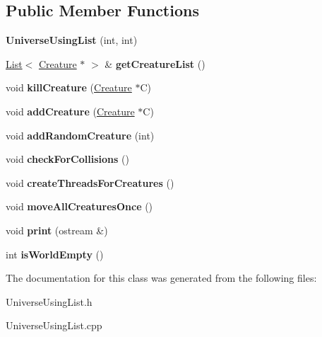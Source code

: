 \subsection*{Public Member Functions}
\begin{DoxyCompactItemize}
\item 
{\bfseries Universe\+Using\+List} (int, int)\hypertarget{class_universe_using_list_a690190032d86eadad922b33166d6d11a}{}\label{class_universe_using_list_a690190032d86eadad922b33166d6d11a}

\item 
\hyperlink{class_list}{List}$<$ \hyperlink{class_creature}{Creature} $\ast$ $>$ \& {\bfseries get\+Creature\+List} ()\hypertarget{class_universe_using_list_a36f07f521195e099c92408ce25ac9928}{}\label{class_universe_using_list_a36f07f521195e099c92408ce25ac9928}

\item 
void {\bfseries kill\+Creature} (\hyperlink{class_creature}{Creature} $\ast$C)\hypertarget{class_universe_using_list_ad5ae1ddeb1ea11111e506373de5364d8}{}\label{class_universe_using_list_ad5ae1ddeb1ea11111e506373de5364d8}

\item 
void {\bfseries add\+Creature} (\hyperlink{class_creature}{Creature} $\ast$C)\hypertarget{class_universe_using_list_a936d1a839b5cd80f9715c7f2e2daf1da}{}\label{class_universe_using_list_a936d1a839b5cd80f9715c7f2e2daf1da}

\item 
void {\bfseries add\+Random\+Creature} (int)\hypertarget{class_universe_using_list_ae7ed5dcf3d2c24f82fd677f6df814818}{}\label{class_universe_using_list_ae7ed5dcf3d2c24f82fd677f6df814818}

\item 
void {\bfseries check\+For\+Collisions} ()\hypertarget{class_universe_using_list_aa42ce1540f469e72a4a05cce7d9f2baf}{}\label{class_universe_using_list_aa42ce1540f469e72a4a05cce7d9f2baf}

\item 
void {\bfseries create\+Threads\+For\+Creatures} ()\hypertarget{class_universe_using_list_a91a69b21d08144a53635272095029cc4}{}\label{class_universe_using_list_a91a69b21d08144a53635272095029cc4}

\item 
void {\bfseries move\+All\+Creatures\+Once} ()\hypertarget{class_universe_using_list_ab02c14d60f147146649289d09b732b5d}{}\label{class_universe_using_list_ab02c14d60f147146649289d09b732b5d}

\item 
void {\bfseries print} (ostream \&)\hypertarget{class_universe_using_list_a9cbe5a6b7497005e60131907a3aa8120}{}\label{class_universe_using_list_a9cbe5a6b7497005e60131907a3aa8120}

\item 
int {\bfseries is\+World\+Empty} ()\hypertarget{class_universe_using_list_ab60b016b417ad376180ff95fb4ac7531}{}\label{class_universe_using_list_ab60b016b417ad376180ff95fb4ac7531}

\end{DoxyCompactItemize}


The documentation for this class was generated from the following files\+:\begin{DoxyCompactItemize}
\item 
Universe\+Using\+List.\+h\item 
Universe\+Using\+List.\+cpp\end{DoxyCompactItemize}
